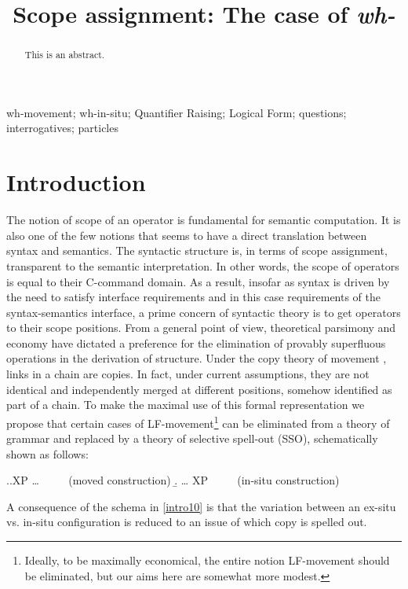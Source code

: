 \documentclass{glossa}
\title[Scope assignment]{Scope assignment: The case of \textit{wh-}}
\author[Tsoulas \& Yeo]%
{%
  \spauthor{George Tsoulas\\
  \institute{University of York}\\
  \small{Heslington, York YO10 5DD, UK\\
  george.tsoulas@york.ac.uk}
  }
  \AND
  \spauthor{Norman Yeo\\
  \institute{University of York}\\
  \small{Heslington, York YO10 5DD, UK\\
  norman.yeo@york.ac.uk}
  }%
}
\begin{document}
\sffamily
\maketitle

\begin{abstract}
This is an abstract.
\end{abstract}

\begin{keywords}
  wh-movement; wh-in-situ; Quantifier Raising; Logical Form; questions; interrogatives; particles
\end{keywords}


\rmfamily
\section{Introduction}
The notion of scope of an operator is fundamental for semantic computation. It is also one of the few notions that seems to have a direct translation between syntax and semantics. The syntactic structure is, in terms of scope assignment, transparent to the semantic interpretation.  In other words, the scope of operators is equal to their C-command domain.  As a result, insofar as syntax is driven by the need to satisfy interface requirements and in this case requirements of the syntax-semantics interface, a prime concern of syntactic theory is to get operators to their scope positions. From a general point of view, theoretical parsimony and economy have dictated a preference for the elimination of provably superfluous operations in the derivation of structure. Under the copy theory of movement \citep{chomsky:1993}, links in a chain are copies. In fact, under current assumptions, they are not identical and independently merged at different positions, somehow identified as part of a chain. To make the maximal use of this formal representation we propose that certain cases of LF-movement\footnote{Ideally, to be maximally economical, the entire notion LF-movement should be eliminated, but our aims here are somewhat more modest.} can be eliminated from a theory of grammar and replaced by a theory of selective spell-out (SSO), schematically shown as follows:

\ex.\label{intro10}\a.XP {\dots}  $\qquad$ (moved construction)
    \b. {\dots} XP $\qquad$ (in-situ construction)

A consequence of the schema in \ref{intro10} is that the variation between an ex-situ vs. in-situ configuration is reduced to an issue of which copy is spelled out.
\end{document}
